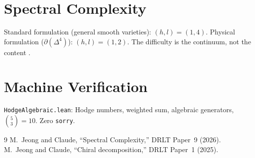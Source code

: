 \documentclass[12pt]{article}
\theoremstyle{remark}
\begin{document}
\section{Spectral Complexity}

Standard formulation (general smooth varieties):
$(h, l) = (1, 4)$. Physical formulation
($\partial(\Delta^4)$): $(h, l) = (1, 2)$.
The difficulty is the continuum, not the content
\cite{Paper9}.

\section{Machine Verification}

\texttt{HodgeAlgebraic.lean}: Hodge numbers, weighted sum,
algebraic generators, $\binom{5}{3} = 10$. Zero \texttt{sorry}.

\begin{thebibliography}{9}
 M.~Jeong and Claude, ``Spectral Complexity,''
  DRLT Paper~9 (2026).
 M.~Jeong and Claude, ``Chiral decomposition,''
  DRLT Paper~1 (2025).
\end{thebibliography}
\end{document}
